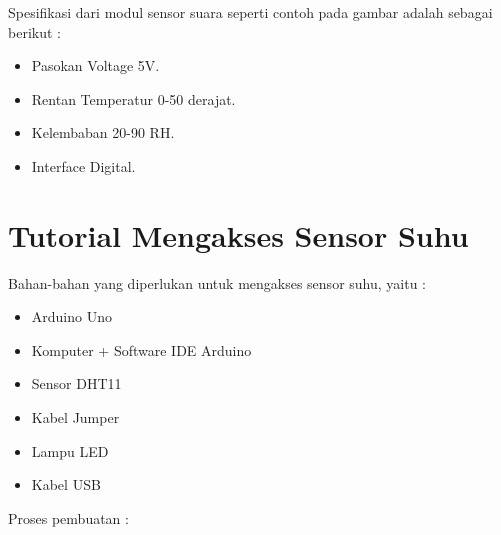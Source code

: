 \documentclass{article}
\begin{document}
Spesifikasi dari modul sensor suara seperti contoh pada gambar adalah sebagai berikut :

\begin{itemize}
	\item Pasokan Voltage 5V.
	\item Rentan Temperatur 0-50 derajat.
	\item Kelembaban 20-90 RH.
	\item Interface Digital.
\end{itemize}

\section{Tutorial Mengakses Sensor Suhu}

\hspace{4mm} Bahan-bahan yang diperlukan untuk mengakses sensor suhu, yaitu :

\begin{itemize}
	\item Arduino Uno 
	\item Komputer + Software IDE Arduino
	\item Sensor DHT11
	\item Kabel Jumper
	\item Lampu LED
	\item Kabel USB
\end{itemize}

\break Proses pembuatan :
\end{document}
